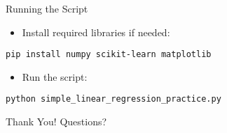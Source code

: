\documentclass[aspectratio=169]{beamer}
\begin{document}
\begin{frame}[fragile]{Running the Script}
  \begin{itemize}
    \item Install required libraries if needed:
  \end{itemize}
  \begin{verbatim}
pip install numpy scikit-learn matplotlib
  \end{verbatim}
  \begin{itemize}
    \item Run the script:
  \end{itemize}
  \begin{verbatim}
python simple_linear_regression_practice.py
  \end{verbatim}
\end{frame}

\begin{frame}
  \centering
  \Huge Thank You!
  \vspace{1cm}
  \normalsize Questions?
\end{frame}
\end{document}
